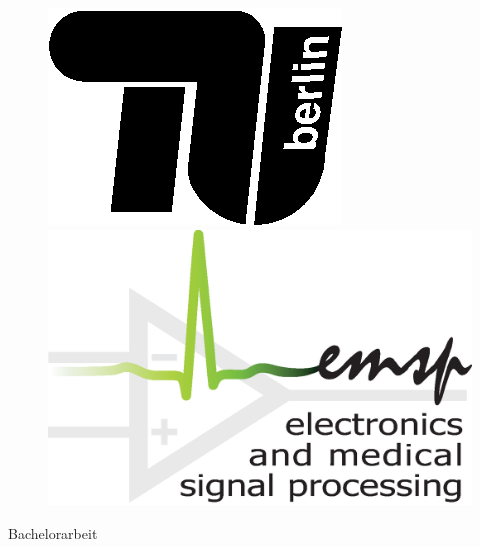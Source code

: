 \begin{titlepage} 
\begin{centering}

	\begin{figure}[!h]
  	\begin{minipage}{0.4\linewidth}
			\begin{center}
				\includegraphics[scale=1]{Titelblatt/tu-logo.eps} 
  		\end{center}  
  	\end{minipage}
		\hfill
  	\begin{minipage}{0.45\linewidth} 
  		\begin{center}
				\includegraphics[scale=0.3]{Titelblatt/Logo_final.eps} 
  		\end{center}    
  	\end{minipage}
	\end{figure}
	
	\vspace{20mm}
	
	\LARGE

	Bachelorarbeit
	

\end{centering}
\end{titlepage}

